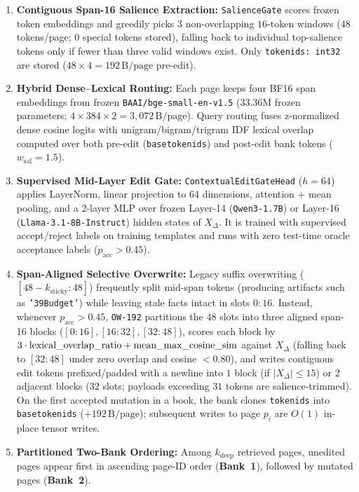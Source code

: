 \documentclass[11pt]{article}
\renewcommand{\_}{\origunderscore\allowbreak}
\begin{document}
\begin{enumerate}
    \item \textbf{Contiguous Span-16 Salience Extraction:} \texttt{SalienceGate} scores frozen token embeddings and greedily picks $3$ non-overlapping $16$-token windows ($48$ tokens/page; $0$ special tokens stored), falling back to individual top-salience tokens only if fewer than three valid windows exist. Only \texttt{token\_ids: int32} are stored ($48 \times 4 = 192\,\text{B/page}$ pre-edit).
    \item \textbf{Hybrid Dense--Lexical Routing:} Each page keeps four BF16 span embeddings from frozen \texttt{BAAI/bge-small-en-v1.5} ($33.36\text{M}$ frozen parameters; $4 \times 384 \times 2 = 3{,}072\,\text{B/page}$). Query routing fuses z-normalized dense cosine logits with unigram/bigram/trigram IDF lexical overlap computed over both pre-edit (\texttt{base\_token\_ids}) and post-edit bank tokens ($w_{\text{sal}} = 1.5$).
    \item \textbf{Supervised Mid-Layer Edit Gate:} \texttt{ContextualEditGateHead} ($h=64$) applies LayerNorm, linear projection to $64$ dimensions, attention + mean pooling, and a 2-layer MLP over frozen Layer-14 (\texttt{Qwen3-1.7B}) or Layer-16 (\texttt{Llama-3.1-8B-Instruct}) hidden states of $X_\Delta$. It is trained with supervised accept/reject labels on training templates and runs with zero test-time oracle acceptance labels ($p_{\text{acc}} > 0.45$).
    \item \textbf{Span-Aligned Selective Overwrite:} Legacy suffix overwriting ($[48-k_{\text{sticky}}:48]$) frequently split mid-span tokens (producing artifacts such as \texttt{'39Budget'}) while leaving stale facts intact in slots $0{:}16$. Instead, whenever $p_{\text{acc}} > 0.45$, \texttt{OW-192} partitions the $48$ slots into three aligned span-16 blocks ($[0{:}16], [16{:}32], [32{:}48]$), scores each block by $3\cdot \text{lexical\_overlap\_ratio} + \text{mean\_max\_cosine\_sim}$ against $X_\Delta$ (falling back to $[32{:}48]$ under zero overlap and cosine $< 0.80$), and writes contiguous edit tokens prefixed/padded with a newline into $1$ block (if $|X_\Delta| \le 15$) or $2$ adjacent blocks ($32$ slots; payloads exceeding $31$ tokens are salience-trimmed). On the first accepted mutation in a book, the bank clones \texttt{token\_ids} into \texttt{base\_token\_ids} ($+192\,\text{B/page}$); subsequent writes to page $p_i$ are $O(1)$ in-place tensor writes.
    \item \textbf{Partitioned Two-Bank Ordering:} Among $k_{\text{deep}}$ retrieved pages, unedited pages appear first in ascending page-ID order (\textbf{Bank~1}), followed by mutated pages (\textbf{Bank~2}).
\end{enumerate}
\end{document}
